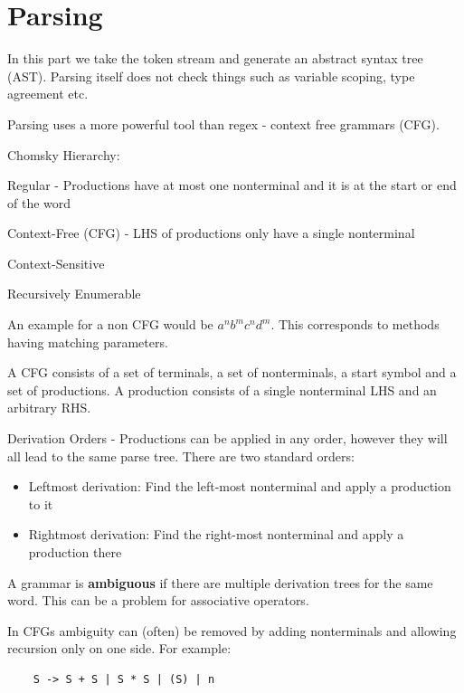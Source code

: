 \section*{Parsing}

In this part we take the token stream and generate an abstract syntax tree (AST). Parsing itself does not check things such as variable scoping, type agreement etc. \medskip

Parsing uses a more powerful tool than regex - context free grammars (CFG). \medskip

Chomsky Hierarchy: 
\begin{compactitem}
	\item Regular - Productions have at most one nonterminal and it is at the start or end of the word
	\item Context-Free (CFG) - LHS of productions only have a single nonterminal
	\item Context-Sensitive 
	\item Recursively Enumerable
\end{compactitem}

An example for a non CFG would be $a^n b^m c^n d^m$. This corresponds to methods having matching parameters.\medskip
	
A CFG consists of a set of terminals, a set of nonterminals, a start symbol and a set of productions. A production consists of a single nonterminal LHS and an arbitrary RHS. \medskip

Derivation Orders - Productions can be applied in any order, however they will all lead to the same parse tree. There are two standard orders:
\begin{itemize}
	\item Leftmost derivation: Find the left-most nonterminal and apply a production to it
	\item Rightmost derivation: Find the right-most nonterminal and apply a production there
\end{itemize}

A grammar is \textbf{ambiguous} if there are multiple derivation trees for the same word. This can be a problem for associative operators. \medskip
	
In CFGs ambiguity can (often) be removed by adding nonterminals and allowing recursion only on one side. For example:\smallskip

\begin{lstlisting}
	S -> S + S | S * S | (S) | n
\end{lstlisting} \smallskip

